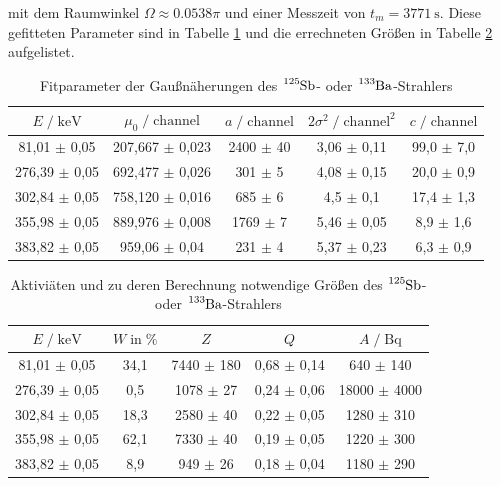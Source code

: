 mit dem Raumwinkel $\Omega \approx \num{0.0538} \pi$ und einer Messzeit von $t_m = \SI{3771}{\second}$.
Diese gefitteten Parameter sind in Tabelle \ref{tab:mess4} und die errechneten Größen in Tabelle \ref{tab:mess5} aufgelistet.

\begin{table}
  \centering
  \caption{Fitparameter der Gaußnäherungen des $\ce{^{125}Sb}$- oder $\ce{^{133}Ba}$-Strahlers}
  \label{tab:mess4}
  \begin{tabular}{c c c c c}
  \toprule
  $E \;/\; \si{\kilo\eV}$ & $\mu_0 \;/\; \text{channel}$ & $a \;/\; \text{channel}$ & 
  $2\sigma^2 \;/\; \text{channel}^2$ & $c \;/\; \text{channel}$ \\
  \midrule
     81,01 $\pm$ 0,05 & 207,667 $\pm$ 0,023 & 2400 $\pm$ 40 & 3,06 $\pm$ 0,11 & 99,0 $\pm$ 7,0 \\
    276,39 $\pm$ 0,05 & 692,477 $\pm$ 0,026 &  301 $\pm$  5 & 4,08 $\pm$ 0,15 & 20,0 $\pm$ 0,9 \\
    302,84 $\pm$ 0,05 & 758,120 $\pm$ 0,016 &  685 $\pm$  6 & 4,5  $\pm$ 0,1  & 17,4 $\pm$ 1,3 \\
    355,98 $\pm$ 0,05 & 889,976 $\pm$ 0,008 & 1769 $\pm$  7 & 5,46 $\pm$ 0,05 &  8,9 $\pm$ 1,6 \\
    383,82 $\pm$ 0,05 & 959,06  $\pm$ 0,04  &  231 $\pm$  4 & 5,37 $\pm$ 0,23 &  6,3 $\pm$ 0,9 \\
  \bottomrule
  \end{tabular}
\end{table}



\begin{table}
  \centering
  \caption{Aktiviäten und zu deren Berechnung notwendige Größen des $\ce{^{125}Sb}$- oder $\ce{^{133}Ba}$-Strahlers}
  \label{tab:mess5}
  \begin{tabular}{c c c c c}
  \toprule
  $E \;/\; \si{\kilo\eV}$ & $W \;\text{in}\; \si{\percent}$ & $Z$ & $Q$ & $A \;/\; \si{\becquerel}$ \\
  \midrule
     81,01 $\pm$ 0,05 & 34,1 & 7440 $\pm$ 180 & 0,68 $\pm$ 0,14 &   640 $\pm$ 140  \\
    276,39 $\pm$ 0,05 &  0,5 & 1078 $\pm$  27 & 0,24 $\pm$ 0,06 & 18000 $\pm$ 4000 \\
    302,84 $\pm$ 0,05 & 18,3 & 2580 $\pm$  40 & 0,22 $\pm$ 0,05 &  1280 $\pm$ 310  \\
    355,98 $\pm$ 0,05 & 62,1 & 7330 $\pm$  40 & 0,19 $\pm$ 0,05 &  1220 $\pm$ 300  \\
    383,82 $\pm$ 0,05 &  8,9 &  949 $\pm$  26 & 0,18 $\pm$ 0,04 &  1180 $\pm$ 290  \\
  \bottomrule
  \end{tabular}
\end{table}


